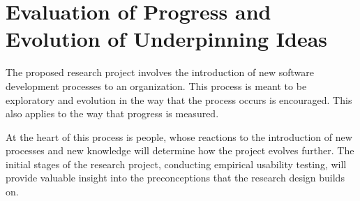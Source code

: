 
\section{Evaluation of Progress and Evolution of Underpinning Ideas} %
\label{sec:evaluation}

The proposed research project involves the introduction of new software development processes to an organization. This process is meant to be exploratory and evolution in the way that the process occurs is encouraged. This also applies to the way that progress is measured. 

At the heart of this process is people, whose reactions to the introduction of new processes and new knowledge will determine how the project evolves further.
The initial stages of the research project, conducting empirical usability testing, will provide valuable insight into the preconceptions that the research design builds on.

